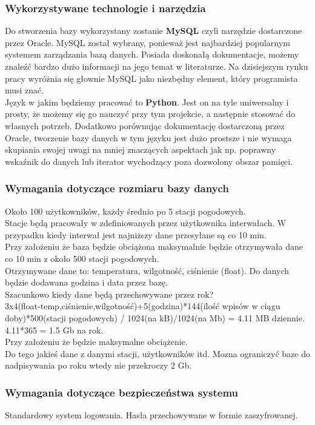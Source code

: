 \documentclass{article}
\begin{document}
\subsubsection{Wykorzystywane technologie i narzędzia}
    Do stworzenia bazy wykorzystany zostanie \textbf{MySQL} czyli narzędzie dostarczone przez Oracle. MySQL został wybrany, ponieważ jest najbardziej popularnym systemem zarządzania bazą danych. Posiada doskonałą dokumentacje, możemy znaleźć bardzo dużo informacji na jego temat w literaturze. Na dzisiejszym rynku pracy wyróżnia się głownie MySQL jako niezbędny element, który programista musi znać.\\
    Język w jakim będziemy pracować to \textbf{Python}. Jest on na tyle uniwersalny i prosty, że możemy się go nauczyć przy tym projekcie, a następnie stosować do własnych potrzeb. Dodatkowo porównując dokumentację dostarczoną przez Oracle, tworzenie bazy danych w tym języku jest dużo prostsze i nie wymaga skupiania swojej uwagi na mniej znaczących aspektach jak np. poprawny wskaźnik do danych lub iterator wychodzący poza dozwolony obszar pamięci.
    \subsubsection{Wymagania dotyczące rozmiaru bazy danych}
    Około 100 użytkowników, każdy średnio po 5 stacji pogodowych.\\
    Stacje będą pracowały w zdefiniowanych przez użytkownika interwałach. W przypadku kiedy interwał jest najniższy dane przesyłane są co 10 min.\\
    Przy założeniu że baza będzie obciążona maksymalnie będzie otrzymywała dane co 10 min z około 500 stacji pogodowych.\\
    Otrzymywane dane to: temperatura, wilgotność, ciśnienie (float). Do danych będzie dodawana godzina i data przez bazę.\\
    Szacunkowo kiedy dane będą przechowywane przez rok? \\
    3x4(float-temp,ciśnienie,wilgotność)+5(godzina)*144(ilość wpisów w ciągu doby)*500(stacji pogodowych) / 1024(na kB)/1024(na Mb) = 4.11 MB dziennie.\\
    4.11*365 = 1.5 Gb na rok.\\
    Przy założeniu że będzie maksymalne obciążenie.\\
    Do tego jakieś dane z danymi stacji, użytkowników itd.
    Mozna ograniczyć baze do nadpisywania po roku wtedy nie przekroczy 2 Gb.
    
\subsubsection{Wymagania dotyczące bezpieczeństwa systemu}
    Standardowy system logowania. Hasła przechowywane w formie zaszyfrowanej.
\end{document}
